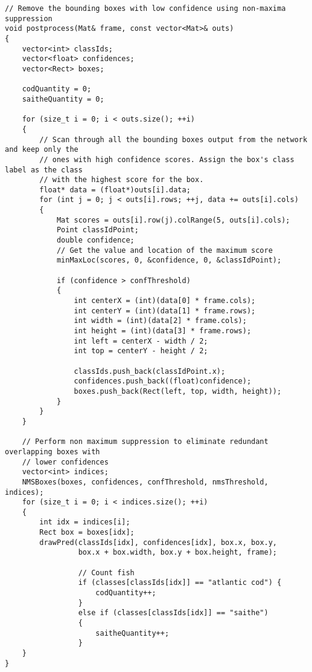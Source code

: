 \begin{verbatim}
// Remove the bounding boxes with low confidence using non-maxima suppression
void postprocess(Mat& frame, const vector<Mat>& outs)
{
    vector<int> classIds;
    vector<float> confidences;
    vector<Rect> boxes;

    codQuantity = 0;
    saitheQuantity = 0;

    for (size_t i = 0; i < outs.size(); ++i)
    {
        // Scan through all the bounding boxes output from the network and keep only the
        // ones with high confidence scores. Assign the box's class label as the class
        // with the highest score for the box.
        float* data = (float*)outs[i].data;
        for (int j = 0; j < outs[i].rows; ++j, data += outs[i].cols)
        {
            Mat scores = outs[i].row(j).colRange(5, outs[i].cols);
            Point classIdPoint;
            double confidence;
            // Get the value and location of the maximum score
            minMaxLoc(scores, 0, &confidence, 0, &classIdPoint);

            if (confidence > confThreshold)
            {
                int centerX = (int)(data[0] * frame.cols);
                int centerY = (int)(data[1] * frame.rows);
                int width = (int)(data[2] * frame.cols);
                int height = (int)(data[3] * frame.rows);
                int left = centerX - width / 2;
                int top = centerY - height / 2;

                classIds.push_back(classIdPoint.x);
                confidences.push_back((float)confidence);
                boxes.push_back(Rect(left, top, width, height));
            }
        }
    }

    // Perform non maximum suppression to eliminate redundant overlapping boxes with
    // lower confidences
    vector<int> indices;
    NMSBoxes(boxes, confidences, confThreshold, nmsThreshold, indices);
    for (size_t i = 0; i < indices.size(); ++i)
    {
        int idx = indices[i];
        Rect box = boxes[idx];
        drawPred(classIds[idx], confidences[idx], box.x, box.y,
                 box.x + box.width, box.y + box.height, frame);
                 
                 // Count fish
                 if (classes[classIds[idx]] == "atlantic cod") {
                     codQuantity++;
                 }
                 else if (classes[classIds[idx]] == "saithe")
                 {
                     saitheQuantity++;
                 }
    }
}
\end{verbatim}

